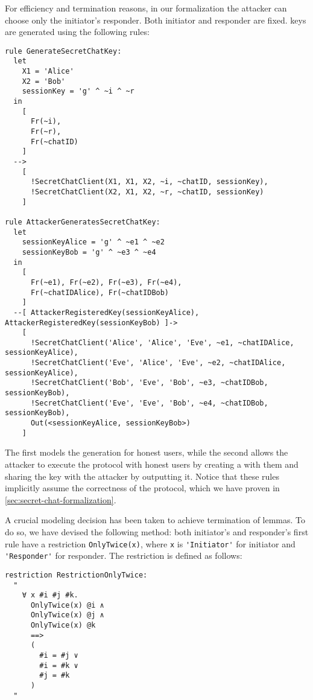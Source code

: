 For efficiency and termination reasons, in our formalization the attacker can choose only the initiator's responder. Both initiator and responder are fixed. \Schat{} keys are generated using the following rules:

\newpage

\begin{lstlisting}
rule GenerateSecretChatKey:
  let
    X1 = 'Alice'
    X2 = 'Bob'
    sessionKey = 'g' ^ ~i ^ ~r
  in
    [
      Fr(~i),
      Fr(~r),
      Fr(~chatID)
    ]
  -->
    [ 
      !SecretChatClient(X1, X1, X2, ~i, ~chatID, sessionKey),
      !SecretChatClient(X2, X1, X2, ~r, ~chatID, sessionKey)
    ]

rule AttackerGeneratesSecretChatKey:
  let
    sessionKeyAlice = 'g' ^ ~e1 ^ ~e2
    sessionKeyBob = 'g' ^ ~e3 ^ ~e4
  in
    [ 
      Fr(~e1), Fr(~e2), Fr(~e3), Fr(~e4),
      Fr(~chatIDAlice), Fr(~chatIDBob)
    ]
  --[ AttackerRegisteredKey(sessionKeyAlice), AttackerRegisteredKey(sessionKeyBob) ]->
    [
      !SecretChatClient('Alice', 'Alice', 'Eve', ~e1, ~chatIDAlice, sessionKeyAlice),
      !SecretChatClient('Eve', 'Alice', 'Eve', ~e2, ~chatIDAlice, sessionKeyAlice),
      !SecretChatClient('Bob', 'Eve', 'Bob', ~e3, ~chatIDBob, sessionKeyBob),
      !SecretChatClient('Eve', 'Eve', 'Bob', ~e4, ~chatIDBob, sessionKeyBob),
      Out(<sessionKeyAlice, sessionKeyBob>)
    ]
\end{lstlisting}

The first models the generation for honest users, while the second allows the attacker to execute the protocol with honest users by creating a \schat{} with them and sharing the key with the attacker by outputting it. Notice that these rules implicitly assume the correctness of the \schat{} protocol, which we have proven in \cref{sec:secret-chat-formalization}.

A crucial modeling decision has been taken to achieve termination of lemmas. To do so, we have devised the following method: both initiator's and responder's first rule have a restriction \lstinline{OnlyTwice(x)}, where \lstinline{x} is \lstinline{'Initiator'} for initiator and \lstinline{'Responder'} for responder. The restriction is defined as follows:

\begin{lstlisting}
restriction RestrictionOnlyTwice:
  "
    ∀ x #i #j #k. 
      OnlyTwice(x) @i ∧
      OnlyTwice(x) @j ∧
      OnlyTwice(x) @k 
      ==>
      (
        #i = #j ∨
        #i = #k ∨
        #j = #k
      )
  "
\end{lstlisting}

